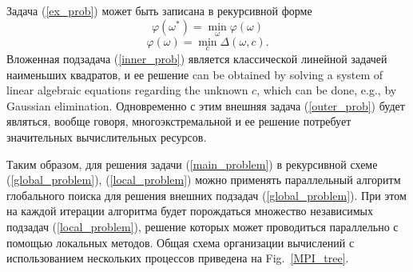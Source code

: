 \documentclass{svproc}
\begin{document}
Задача (\ref{ex_prob}) может быть записана в рекурсивной форме
\begin{equation}\label{outer_prob}
\varphi(\omega^*) = \min_\omega \varphi(\omega)
\end{equation}
\begin{equation}\label{inner_prob}
\varphi(\omega) = \min_c \Delta(\omega,c).
\end{equation}
Вложенная подзадача (\ref{inner_prob}) является классической линейной задачей наименьших квадратов, и ее решение can be obtained by solving a system of linear algebraic equations regarding the unknown $c$, which can be done, e.g., by Gaussian elimination. Одновременно с этим внешняя задача (\ref{outer_prob}) будет являться, вообще говоря, многоэкстремальной и ее решение потребует значительных вычислительных ресурсов.
 
Таким образом, для решения задачи (\ref{main_problem}) в рекурсивной схеме (\ref{global_problem}), (\ref{local_problem}) можно применять параллельный алгоритм глобального поиска для решения внешних подзадач (\ref{global_problem}). При этом на каждой итерации алгоритма будет порождаться множество независимых подзадач (\ref{local_problem}), решение которых может проводиться параллельно с помощью локальных методов.
Общая схема организации вычислений с использованием нескольких процессов приведена на Fig.~\ref{MPI_tree}. 
\end{document}
